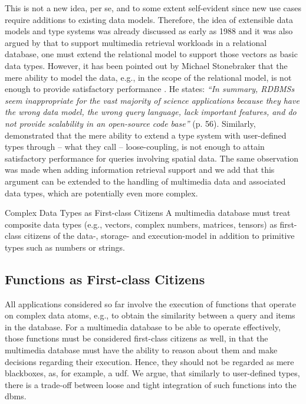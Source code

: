 This is not a new idea, per se, and to some extent self-evident since new use cases require additions to existing data models. Therefore, the idea of extensible data models and type systems was already discussed as early as 1988 \cite{Linnemann:1988Design} and it was also argued by \cite{Giangreco:2018Database} that to support multimedia retrieval workloads in a relational database, one must extend the relational model to support those vectors as basic data types. However, it has been pointed out by Michael Stonebraker that the mere ability to model the data, e.g., in the scope of the relational model, is not enough to provide satisfactory performance \cite{Stonebraker:2013SciDB}. He states: \emph{``In summary, RDBMSs seem inappropriate for the vast majority of science applications because they have the wrong data model, the wrong query language, lack important features, and do not provide scalability in an open-source code base''} \cite{Stonebraker:2013SciDB} (p. 56). Similarly, \cite{Whang:2010Tightly} demonstrated that the mere ability to extend a type system with user-defined types through -- what they call -- loose-coupling, is not enough to attain satisfactory performance for queries involving spatial data. The same observation was made when adding information retrieval support \cite{Whang:2015DB} and we add that this argument can be extended to the handling of multimedia data and associated data types, which are potentially even more complex.

\begin{requirement}[label=requirement:complex_data_types]{Complex Data Types as First-class Citizens}{}
    A multimedia database must treat composite data types (e.g., vectors, complex numbers, matrices, tensors) as first-class citizens of the data-, storage- and execution-model in addition to primitive types such as numbers or strings.
\end{requirement}

\subsection{Functions as First-class Citizens}

All applications considered so far involve the execution of functions that operate on complex data atoms, e.g., to obtain the similarity between a query and items in the database. For a multimedia database to be able to operate effectively, those functions must be considered first-class citizens as well, in that the multimedia database must have the ability to reason about them and make decisions regarding their execution. Hence, they should not be regarded as mere blackboxes, as, for example, a \acrfull{udf}. We argue, that similarly to user-defined types, there is a trade-off between loose and tight integration of such functions into the \acrshort{dbms}.

